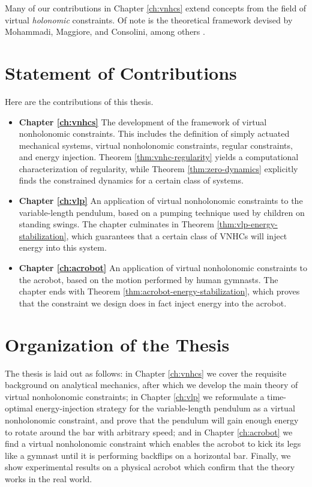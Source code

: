 Many of our contributions in Chapter \ref{ch:vnhcs} extend
concepts from the field of virtual \textit{holonomic} constraints. 
Of note is the theoretical framework devised by Mohammadi, Maggiore, and
Consolini, among others
\cite{vhcs_for_el_systems,dynamic_vhcs_stabilize_closed_orbits,lagrangian_structure_reduced_dynamics_vhcs,xingbo_thesis}.

\section{Statement of Contributions}
Here are the contributions of this thesis.
\begin{itemize}[label={}]
   \item \textbf{Chapter \ref{ch:vnhcs}} The development of the framework of
      virtual nonholonomic constraints.
      This includes the definition of simply actuated mechanical systems, virtual
      nonholonomic constraints, regular constraints, and energy injection.
      Theorem \ref{thm:vnhc-regularity} yields a computational characterization
      of regularity, while Theorem \ref{thm:zero-dynamics} explicitly finds the
      constrained dynamics for a certain class of systems.
   \item \textbf{Chapter \ref{ch:vlp}} An application of virtual nonholonomic
      constraints to the variable-length pendulum, based on a pumping technique
      used by children on standing swings.
      The chapter culminates in Theorem \ref{thm:vlp-energy-stabilization},
      which guarantees that a certain class of VNHCs will inject energy into
      this system.
   \item \textbf{Chapter \ref{ch:acrobot}} An application of virtual
      nonholonomic constraints to the acrobot, based on the motion performed by
      human gymnasts.
      The chapter ends with Theorem \ref{thm:acrobot-energy-stabilization},
      which proves that the constraint we design does in fact inject energy into
      the acrobot.
\end{itemize}

\section{Organization of the Thesis}
The thesis is laid out as follows: 
in Chapter \ref{ch:vnhcs} we cover the requisite background on analytical 
mechanics, after which we develop the main theory of virtual nonholonomic
constraints;
in Chapter \ref{ch:vlp} we reformulate a time-optimal energy-injection strategy
for the variable-length pendulum as a virtual nonholonomic constraint, and
prove that the pendulum will gain enough energy to rotate around the bar with
arbitrary speed;
and in Chapter \ref{ch:acrobot} we find a virtual nonholonomic constraint 
which enables the acrobot to kick its legs like a gymnast until it is
performing backflips on a horizontal bar.
Finally, we show experimental results on a physical acrobot which confirm
that the theory works in the real world.

